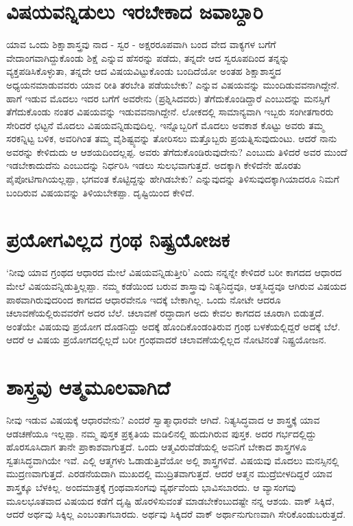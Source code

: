 \section*{ವಿಷಯವನ್ನಿಡುಲು ಇರಬೇಕಾದ ಜವಾಬ್ದಾರಿ}

ಯಾವ  ಒಂದು ಶಿಕ್ಷಾಶಾಸ್ತ್ರವು ನಾದ - ಸ್ವರ - ಅಕ್ಷರರೂಪವಾಗಿ ಬಂದ ವೇದ ವಾಕ್ಯಗಳ ಬಗೆಗೆ ವೇದಾಂಗವಾಗಿದ್ದುಕೊಂಡು ಶಿಕ್ಷೆ  ಎನ್ನುವ ಹೆಸರನ್ನು  ಪಡೆದು, ತನ್ನದೇ ಆದ ಸ್ವರೂಪದಿಂದ ತನ್ನನ್ನು ವ್ಯಕ್ತಪಡಿಸಿಕೊಳ್ಳುತಾ, ತನ್ನದೇ ಆದ ವಿಷಯವಿಟ್ಟುಕೊಂಡು ಬಂದಿದೆಯೋ ಅಂತಹ ಶಿಕ್ಷಾಶಾಸ್ತ್ರದ ಅಧ್ಯಯನಮಾಡುವವರು ಯಾವ ರೀತಿ ತರಬೇತಿ ಪಡೆಯಬೇಕು?  ಎನ್ನುವ ವಿಷಯವನ್ನು ಮುಂದಿಡುವವನಾಗಿದ್ದೇನೆ. ಹಾಗೆ ಇಡುವ ಮೊದಲು ಇದರ ಬಗೆಗೆ ಅವರೇನು (ಪ್ರಶ್ನಿಸಿದವರು) ತೆಗೆದುಕೊಂಡಿದ್ದಾರೆ ಎಂಬುದನ್ನು  ಮನಸ್ಸಿಗೆ ತೆಗೆದುಕೊಂಡು ನಂತರ ವಿಷಯವನ್ನು ಇಡುವವನಾಗಿದ್ದೇನೆ. ಲೋಕದಲ್ಲಿ  ಸಾಮಾನ್ಯವಾಗಿ ಇಬ್ಬರು ಸಂಗೀತಗಾರರು ಸೇರಿದರೆ ಛಟ್ಟನೆ ಮೊದಲು ವಿಷಯವನ್ನಿಡುವುದಿಲ್ಲ. ಇನ್ನೊಬ್ಬರಿಗೆ ಮೊದಲು ಅವಕಾಶ ಕೊಟ್ಟು ಅವರು ತಮ್ಮ ಸರಕನ್ನಿಟ್ಟ ಬಳಿಕ, ಅವರಿಗಿಂತ ತಮ್ಮ ವೈಶಿಷ್ಟ್ಯವನ್ನು  ತೋರಿಸಲು ಮತ್ತೊಬ್ಬರು ಪ್ರಯತ್ನಿಸುವುದುಂಟು. ಆದರೆ ನಾನು ಅವರನ್ನು  ಕೇಳಿದುದು ಆ ಆಶಯದಿಂದಲ್ಲಪ್ಪ. ಅವರು ತೆಗೆದುಕೊಂಡಿರುವುದೇನು? ಎಂಬುದು ತಿಳಿದರೆ ಅವರ ಮುಂದೆ ಇಡಬೇಕಾದುದೆನು ಎಂಬುದನ್ನು ನಿರ್ಧರಿಸಿ ಇಡಲು ಸುಲಭವಾಗುತ್ತದೆ. ಅದಕ್ಕಾಗಿ ಕೇಳಿದೆನೇ ಹೊರತು ಪೈಪೋಟಿಗಾಗಿಯಲ್ಲಪ್ಪಾ, ಭಗವಂತ ಕೊಟ್ಟಿದ್ದನ್ನು  ಹೇಗಿಡಬೇಕು? ಎನ್ನುವುದನ್ನು  ತಿಳಿಸುವುದಕ್ಕಾಗಿಯಾದರೂ ನಿಮಗೆ ಬಂದಿರುವ ವಿಷಯವನ್ನು  ತಿಳಿಯಬೇಕಪ್ಪಾ. ದೃಷ್ಟಿಯಿಂದ ಕೇಳಿದೆ.

\section*{ಪ್ರಯೋಗವಿಲ್ಲದ ಗ್ರಂಥ ನಿಷ್ಪ್ರಯೋಜಕ}

`ನೀವು  ಯಾವ ಗ್ರಂಥದ ಆಧಾರದ ಮೇಲೆ ವಿಷಯವನ್ನಿಡುತ್ತೀರಿ' ಎಂದು ನನ್ನನ್ನೇ ಕೇಳಿದರೆ ಬರೀ ಕಾಗದದ ಆಧಾರದ ಮೇಲೆ ವಿಷಯವನ್ನಿಡುತ್ತಿಲ್ಲಪ್ಪಾ. ನಮ್ಮ  ಕಡೆಯಿಂದ ಬರುವ ಶಾಸ್ತ್ರಾವು  ನಿತ್ಯನಿದ್ಧವೂ, ಆತ್ಮಸಿದ್ಧವೂ ಆಗಿರುವ ವಿಷಯದ ಪಾಠವಾಗಿರುವುದರಿಂದ ಕಾಗದದ ಆಧಾರವೇನೂ ಇದಕ್ಕೆ  ಬೇಕಾಗಿಲ್ಲ. ಒಂದು ನೋಟೇ ಆದರೂ ಚಲಾವಣೆಯಲ್ಲಿರುವವರೆಗೆ ಅದರ ಬೆಲೆ. ಚಲಾವಣೆ ರದ್ಧಾದಾಗ ಅದು ಕೇವಲ ಕಾಗದದ ಚೂರಾಗಿ ಬಿಡುತ್ತದೆ. ಅಂತೆಯೇ ವಿಷಯವು  ಪ್ರಯೋಗ ದೊಡನಿದ್ದು  ಅದಕ್ಕೆ  ಹೊಂದಿಕೊಂಡಂತಿರುವ ಗ್ರಂಥ  ಬಳಕೆಯಲ್ಲಿದ್ದರೆ ಅದಕ್ಕೆ  ಬೆಲೆ.  ಆದರೆ ಆ ವಿಷಯ ಪ್ರಯೋಗದಲ್ಲಿಲ್ಲದೆ ಬರೀ ಗ್ರಂಥವಾದರೆ  ಚಲಾವಣೆಯಲ್ಲಿಲ್ಲದ ನೋಟಿನಂತೆ  ನಿಷ್ಪ್ರಯೋಜನ.

\section*{ಶಾಸ್ತ್ರವು  ಆತ್ಮಮೂಲವಾಗಿದೆ}

ನೀವು  ಇಡುವ ವಿಷಯಕ್ಕೆ  ಆಧಾರವೇನು? ಎಂದರೆ  ಸ್ವಾತ್ಮಾಧಾರವೇ ಆಗಿದೆ.  ನಿತ್ಯಸಿದ್ಧವಾದ ಆ ಶಾಸ್ತ್ರಕ್ಕೆ  ಯಾವ  ಆಡಚಣೆಯೂ ಇಲ್ಲಪ್ಪಾ. ನಮ್ಮ  ಪುಸ್ತಕ  ಪ್ರಕೃತಿಯ ಮಡಿಲಿನಲ್ಲಿ  ಹುದುಗಿರುವ ಪುಸ್ತಕ. ಅದರ ಗರ್ಭದಲ್ಲಿದ್ದು  ಹೊರಸೂಸಿದಾಗ ತಾನೇ  ಪ್ರಾಕಾಶವಾಗುತ್ತದೆ. ಒಂದು  ಆತ್ಮವಿರುವೆಡೆಯಲ್ಲಿ ಅವನಿಗೆ ಬೇಕಾದ ಶಾಸ್ತ್ರಗಳೂ ಸ್ವತಃಸಿದ್ಧವಾಗಿಯೇ ಇವೆ. ಎಲ್ಲಿ ಆತ್ಮಗಳು ಓಡಾಡುತ್ತಿವೆಯೋ ಅಲ್ಲಿ ಶಾಸ್ತ್ರಗಳಿವೆ. ವಿಷಯವು ಮೊದಲು ಮನಸ್ಸಿನಲ್ಲಿ  ಮುದ್ರಣವಾಗುತ್ತದೆ. ಎರಡನೆಯದಾಗಿ ಮುಖದಲ್ಲಿ  ಮುದ್ರಿತವಾಗುತ್ತದೆ. ಆದರೆ ಆತ್ಮನ ಮುದ್ರೆಬೀಳದಿದ್ದರೆ ಯಾವ ಶಾಸ್ತ್ರಕ್ಕೂ  ಬೆಳಕಿಲ್ಲ.  ಅಂದಮಾತ್ರಕ್ಕೆ  ಗ್ರಂಥವಾಸಂಗವು  ವ್ಯರ್ಥವೆಂದು  ಭಾವಿಸಬಾರದು. ಆ ವ್ಯಾಸಂಗವು  ಮೂಲಭೂತವಾದ ವಿಷಯದ ಕಡೆಗೆ ದೃಷ್ಟಿ ಹೊರಳಿಸುವಂತೆ  ಮಾಡಬೇಕೆಂಬುದಷ್ಟೇ ನನ್ನ ಆಶಯ. ವಾಕ್ ಸಿಕ್ಕಿದೆ, ಆದರೆ ಅರ್ಥವು  ಸಿಕ್ಕಿಲ್ಲ ಎಂಬಂತಾಗಬಾರದು. ಅರ್ಥವು ಸಿಕ್ಕಿದರೆ  ವಾಕ್ ಅರ್ಥಾನುಗುಣವಾಗಿ ಸೇರಿಕೊಂಡುಬರುತ್ತದೆ. 

